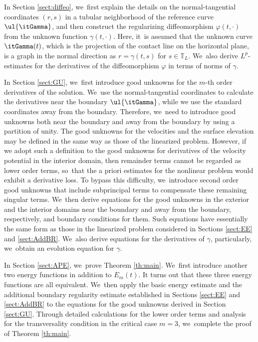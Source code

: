 In Section \ref{sect:diffeo}, we~first explain the details on the normal-tangential coordinates $(r,s)$ in a tubular neighborhood
of the reference curve $\ul{\itGamma}$, and then construct the regularizing diffeomorphism $\varphi(t,\cdot)$ from the unknown function $\gamma(t,\cdot)$.
Here, it~is assumed that the unknown curve $\itGamma(t)$, which is the projection of the contact line on the horizontal plane,
is a graph in the normal direction as $r=\gamma(t,s)$ for $s\in\mathbb{T}_L$. We~also derive $L^p$-estimates for the derivatives of the diffeomorphism $\varphi$ in terms of norms of $\gamma$.

In Section \ref{sect:GU}, we~first introduce good unknowns for the $m$-th order derivatives of the solution. We~use the normal-tangential coordinates to calculate the derivatives near the boundary $\ul{\itGamma}$,
while we use the standard coordinates away from the boundary.
Therefore, we~need to introduce good unknowns both near the boundary and away from the boundary by using a partition of unity.
The good unknowns for the velocities and the surface elevation may be defined in the same way as those of the linearized problem.
However, if we adopt such a definition to the good unknowns for derivatives of the velocity potential in the interior domain,
then remainder terms cannot be regarded as lower order terms, so~that the a priori estimates for the nonlinear problem would exhibit a derivative loss.
To bypass this difficulty, we~introduce second order good unknowns that include subprincipal terms to compensate these remaining singular terms. We~then derive equations for the good unknowns in the exterior and the interior domains near the boundary and away from the boundary, respectively,
and boundary conditions for them.
Such equations have essentially the same form as those in the linearized problem considered in Sections \ref{sect:EE} and \ref{sect:AddBR}. We~also derive equations for the derivatives of $\gamma$, particularly, we~obtain an evolution equation for $\gamma$.

In Section \ref{sect:APE}, we~prove Theorem \ref{th:main}. We~first introduce another two energy functions in addition to $E_m(t)$.
It turns out that these three energy functions are all equivalent. We~then apply the basic energy estimate and the additional boundary regularity estimate established in Sections \ref{sect:EE} and \ref{sect:AddBR}
to the equations for the good unknowns derived in Section \ref{sect:GU}.
Through detailed calculations for the lower order terms and analysis for the transversality condition in the critical case $m=3$, we~complete the proof of Theorem \ref{th:main}.

